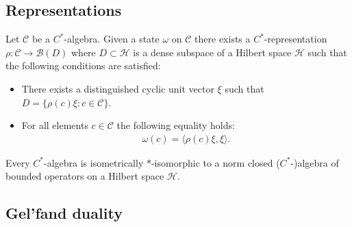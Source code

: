 \subsection{Representations}


    \begin{construct}
        Let $\mathcal{C}$ be a $C^*$-algebra. Given a state $\omega$ on $\mathcal{C}$ there exists a $C^*$-representation $\rho:\mathcal{C}\rightarrow\mathcal{B}(D)$ where $D\subset\mathcal{H}$ is a dense subspace of a Hilbert space $\mathcal{H}$ such that the following conditions are satisfied:
        \begin{itemize}
            \item There exists a distinguished cyclic unit vector $\xi$ such that $D = \{\rho(c)\xi: c\in\mathcal{C}\}$.
            \item For all elements $c\in\mathcal{C}$ the following equality holds:
            \begin{gather}
                \omega(c) = \langle \rho(c)\xi,\xi \rangle.
            \end{gather}
        \end{itemize}
    \end{construct}

    \begin{theorem}
        Every $C^*$-algebra is isometrically $\ast$-isomorphic to a norm closed ($C^*$-)algebra of bounded operators on a Hilbert space $\mathcal{H}$.
    \end{theorem}

\subsection{Gel'fand duality}

